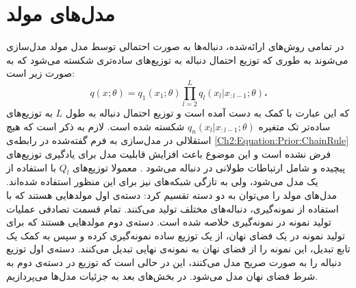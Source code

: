  \section{ مدل‌های مولد‌‌ }
 \label{Model:GenerativeModel:GeneralFormChainRule}
 در تمامی روش‌های ارائه‌شده، دنباله‌ها به صورت احتمالی توسط مدل مولد مدل‌سازی می‌شوند به طوری که توزیع احتمال دنباله به توزیع‌های ساده‌تری شکسته می‌شود که به صورت زیر است:
 \begin{equation}\label{Ch2:Equation:Prior:ChainRule}
 q(x;\theta) = q_1(x_1;\theta) \prod_{l=2}^{L}{q_l(x_l | x_{:l-1};\theta)}،
 \end{equation}
که این عبارت با کمک 
به دست آمده است و توزیع احتمال دنباله به طول $L$ به توزیع‌های ساده‌تر تک متغیره $q_n(x_l | x_{:l-1};\theta)$ شکسته شده است.
 \newline
  لازم به ذکر است که هیچ استقلالی در  مدل‌سازی  به فرم گفته‌شده در رابطه‌ی \ref{Ch2:Equation:Prior:ChainRule} فرض نشده است و این موضوع باعث افزایش قابلیت مدل برای یادگیری توزیع‌های پیچیده و شامل ارتباطات طولانی در دنباله می‌شود \cite{Bowman2016VAE}.
\newline
 معمولا توزیع‌های $Q_l$   با استفاده از یک 
 مدل می‌شود، ولی به تازگی شبکه‌های
  نیز برای این منظور استفاده شده‌اند.
 \newline
  مدل‌های مولد را می‌توان به دو دسته تقسیم کرد:
   دسته‌ی اول مولد‌هایی هستند که با استفاده از نمونه‌گیری، دنباله‌های مختلف تولید می‌کنند. تمام قسمت تصادفی عملیات تولید نمونه در نمونه‌گیری خلاصه شده‌ است.
   دسته‌ی دوم مولد‌هایی هستند که برای تولید نمونه در یک فضای نهان، از یک توزیع ساده نمونه‌گیری کرده و سپس به کمک یک تابع تبدیل، این نمونه را‌ از فضای نهان به نمونه‌ی نهایی تبدیل می‌کنند.
  دسته‌ی اول توزیع دنباله را به صورت صریح مدل می‌کنند، این در حالی است که توزیع در دسته‌ی دوم به شرط فضای نهان مدل می‌شود. در بخش‌های بعد به جزئیات مدل‌ها می‌پردازیم.
